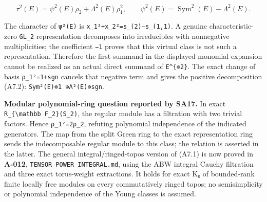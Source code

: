 \documentclass[
  10pt,
]{article}
\begin{document}
\[
\tau^2(E)=\psi^2(E)\rho_2+\Lambda^2(E)\rho_1^2,
\qquad \psi^2(E)=\operatorname{Sym}^2(E)-\Lambda^2(E).
\]

The character of \texttt{\small ψ²(\allowbreak{}E)\allowbreak{}} is
\texttt{\small x\_\allowbreak{}1²+\allowbreak{}x\_\allowbreak{}2²=\allowbreak{}s\_\allowbreak{}(\allowbreak{}2)\allowbreak{}−s\_\allowbreak{}(\allowbreak{}1,\allowbreak{}1)\allowbreak{}}.
A genuine characteristic-zero \texttt{\small GL\_\allowbreak{}2}
representation decomposes into irreducibles with nonnegative
multiplicities; the coefficient \texttt{\small −1} proves that this
virtual class is not such a representation. Therefore the first summand
in the displayed monomial expansion cannot be realized as an actual
direct summand of
\texttt{\small E\textasciicircum{}\{⊗\allowbreak{}2\}}. The exact change
of basis
\texttt{\small ρ\_\allowbreak{}1²=\allowbreak{}1+\allowbreak{}sgn}
cancels that negative term and gives the positive decomposition (A7.2):
\texttt{\small Sym²(\allowbreak{}E)\allowbreak{}⊗\allowbreak{}1 ⊕\allowbreak{}Λ²(\allowbreak{}E)\allowbreak{}⊗\allowbreak{}sgn}.

\textbf{Modular polynomial-ring question reported by SA17.} In exact
\texttt{\small R\_\allowbreak{}\{\textbackslash{}mathbb F\_\allowbreak{}2\}(\allowbreak{}S\_\allowbreak{}2)\allowbreak{}},
the regular module has a filtration with two trivial factors. Hence
\texttt{\small ρ\_\allowbreak{}1²=\allowbreak{}2ρ\_\allowbreak{}2},
refuting polynomial independence of the indicated generators. The map
from the split Green ring to the exact representation ring sends the
indecomposable regular module to this class; the relation is asserted in
the latter. The general integral/ringed-topos version of (A7.1) is now
proved in \textbf{A-012},
\texttt{\small TENSOR\_\allowbreak{}POWER\_\allowbreak{}INTEGRAL.md},
using the ABW integral Cauchy filtration and three exact torus-weight
extractions. It holds for exact K₀ of bounded-rank finite locally free
modules on every commutatively ringed topos; no semisimplicity or
polynomial independence of the Young classes is assumed.
\end{document}
